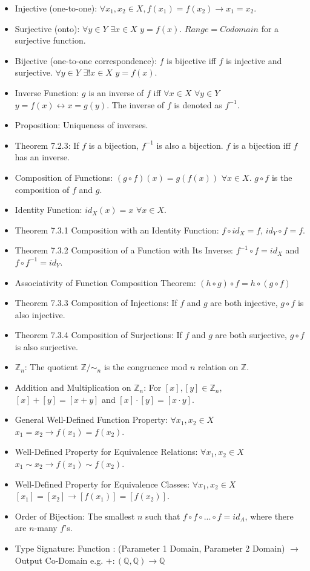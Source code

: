 \documentclass[10pt, portrait]{article}
\begin{document}
\begin{multicols*}{2}
\begin{itemize}
    \item Injective (one-to-one): $\forall x_1, x_2 \in X, f(x_1) = f(x_2) \rightarrow x_1 = x_2$.
    \item Surjective (onto): $\forall y \in Y$ $\exists x \in X$ $y = f(x)$. $Range = Codomain$ for a surjective function.
    \item Bijective (one-to-one correspondence): $f$ is bijective iff $f$ is injective and surjective. $\forall y \in Y$ $\exists! x \in X$ $y = f(x)$.
    \item Inverse Function: $g$ is an inverse of $f$ iff $\forall x \in X$ $\forall y \in Y$ $y = f(x) \leftrightarrow x = g(y)$. The inverse of $f$ is denoted as $f^{-1}$.
    \item Proposition: Uniqueness of inverses.
    \item Theorem 7.2.3: If $f$ is a bijection, $f^{-1}$ is also a bijection. $f$ is a bijection iff $f$ has an inverse.
    \item Composition of Functions:  $(g \circ f)(x) = g(f(x))$ $\forall x \in X$. $g \circ f$ is the composition of $f$ and $g$.
    \item Identity Function: $id_X(x) = x$ $\forall x \in X$.
    \item Theorem 7.3.1 Composition with an Identity Function: $f \circ id_X = f$, $id_Y \circ f = f$.
    \item Theorem 7.3.2 Composition of a Function with Its Inverse: $f^{-1} \circ f = id_X$ and $f \circ f^{-1} = id_Y$.
    \item Associativity of Function Composition Theorem: $(h \circ g) \circ f = h \circ (g \circ f)$
    \item Theorem 7.3.3 Composition of Injections: If $f$ and $g$ are both injective, $g \circ f$ is also injective.
    \item Theorem 7.3.4 Composition of Surjections: If $f$ and $g$ are both surjective, $g \circ f$ is also surjective.
    \item $\mathbb{Z}_{n}$: The quotient $\mathbb{Z}/\sim_n$ is the congruence mod $n$ relation on $\mathbb{Z}$.
    \item Addition and Multiplication on $\mathbb{Z}_{n}$: For $[x], [y] \in \mathbb{Z}_{n}$, $[x] + [y] = [x+y]$ and $[x] \cdot [y] = [x \cdot y]$.
    \item General Well-Defined Function Property: $\forall x_1, x_2 \in X$ $x_1 = x_2 \rightarrow f(x_1) = f(x_2)$.
    \item Well-Defined Property for Equivalence Relations: $\forall x_1, x_2 \in X$ $x_1 \sim x_2 \rightarrow f(x_1) \sim f(x_2)$.
    \item Well-Defined Property for Equivalence Classes: $\forall x_1, x_2 \in X$ $[x_1] = [x_2] \rightarrow [f(x_1)] = [f(x_2)]$.
    \item Order of Bijection: The smallest $n$ such that $f \circ f \circ ... \circ f = id_A$, where there are $n$-many $f$'s.
    \item Type Signature: Function : (Parameter 1 Domain, Parameter 2 Domain) $\rightarrow$ Output Co-Domain e.g. $+: (\mathbb{Q}, \mathbb{Q}) \rightarrow \mathbb{Q}$
\end{itemize}


\end{multicols*}
\end{document}
